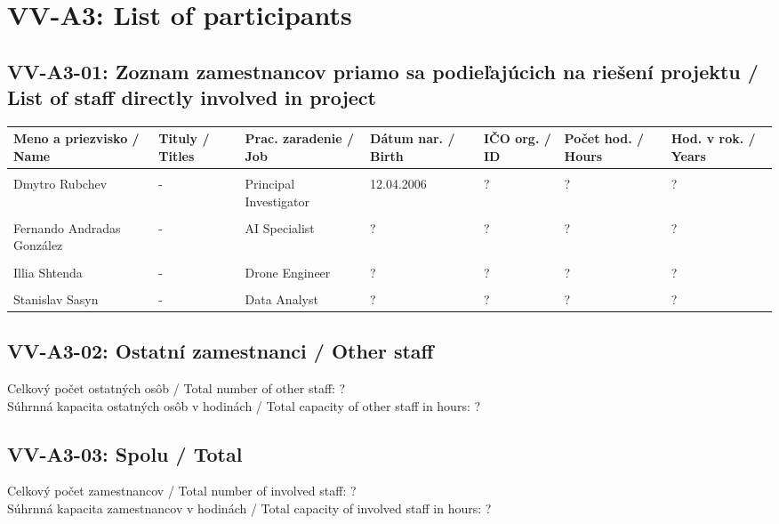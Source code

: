 
\section*{VV-A3: List of participants}
\subsection*{VV-A3-01: Zoznam zamestnancov priamo sa podieľajúcich na riešení projektu / List of staff directly involved in project \\}
\begin{tabular}{p{} p{2cm} p{3cm} p{2.5cm} p{2cm} p{2cm} p{2.5cm}}
        \toprule
        Meno a priezvisko / Name & Tituly / Titles & Prac. zaradenie / Job & Dátum nar. / Birth & IČO org. / ID & Počet hod. / Hours & Hod. v rok. / Years \\
        \midrule
        \\Dmytro Rubchev & - & Principal Investigator & 12.04.2006 & ? & ? & ? \\
        \\Fernando Andradas González & - & AI Specialist & ? & ? & ? & ? \\
        \\Illia Shtenda & - & Drone Engineer & ? & ? & ? & ? \\
        \\Stanislav Sasyn & - & Data Analyst & ? & ? & ? & ? \\
        \bottomrule
    \end{tabular}
\subsection{VV-A3-02: Ostatní zamestnanci / Other staff}
Celkový počet ostatných osôb / Total number of other staff: ? \\
    Súhrnná kapacita ostatných osôb v hodinách / Total capacity of other staff in hours: ?
\subsection{VV-A3-03: Spolu / Total}
Celkový počet zamestnancov / Total number of involved staff: ? \\
    Súhrnná kapacita zamestnancov v hodinách / Total capacity of involved staff in hours: ?


